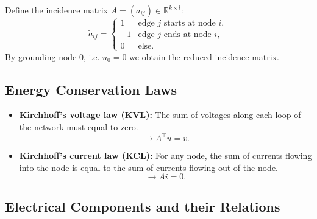 	\begin{frame}
		\vfill
		Define the incidence matrix $A = (a_{ij}) \in \mathbb{R}^{k \times l}$:
		\begin{displaymath}
			\tilde{a}_{ij} = 
			\begin{cases}
				1 &   \text{edge $j$ starts at node $i$},\\
				-1 &  \text{edge $j$  ends at node $i$},\\
				0 & \text{else}.				
			\end{cases}
		\end{displaymath}
		By grounding node $0$, i.e. $u_0 = 0$ we obtain the reduced incidence matrix.
		\vfill
	\end{frame}

	\subsection{Energy Conservation Laws}
	\begin{frame}
		\vfill
		\begin{itemize}
			\item \textbf{Kirchhoff's voltage law (KVL):} \newline
			The sum of voltages along each loop of the network must equal to zero.
			\begin{equation}
				\label{KVL}
				\to A^\top  u = v.
			\end{equation}
			\item \textbf{Kirchhoff's current law (KCL):} \newline
			For any node, the sum of currents flowing into the node is equal to the sum of currents flowing out of the node.
			\begin{equation}
				\label{KCL}
				\to A  i = 0.
			\end{equation}
		\end{itemize}
		\vfill
	\end{frame}

	\subsection{Electrical Components and their Relations}
		
